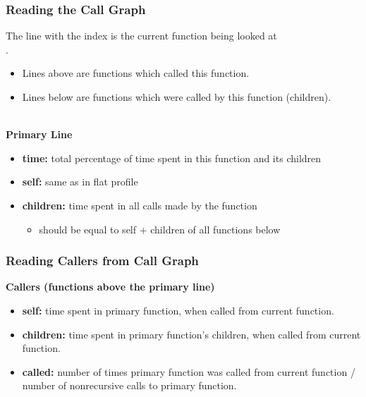 \documentclass[aspectratio=43]{beamer}
\newenvironment{changemargin}[1]{%
  \begin{list}{}{%
    \setlength{\topsep}{0pt}%
    \setlength{\leftmargin}{#1}%
    \setlength{\rightmargin}{1em}
    \setlength{\listparindent}{\parindent}%
    \setlength{\itemindent}{\parindent}%
    \setlength{\parsep}{\parskip}%
  }%
  \item[]}{\end{list}}
\begin{document}
\begin{frame}[fragile]
  \frametitle{Reading the Call Graph}

  \begin{changemargin}{1.5cm}
    The line with the index is the current function being looked at\\
      \qquad {}.\\
\begin{itemize}
    \item Lines above are functions which called this function.
    \item Lines below are functions which were called by this function
      (children).
  \end{itemize}
~\\
  {\bf Primary Line}

  \begin{itemize}  
    \item {\bf time:} total percentage of time spent in this function and its
      children
    \item {\bf self:} same as in flat profile
    \item {\bf children:} time spent in all calls made by the function
      \begin{itemize}
        \item should be equal to self + children of all functions below
      \end{itemize}
  \end{itemize}
  \end{changemargin}
\end{frame}

\begin{frame}[fragile]
  \frametitle{Reading Callers from Call Graph}

  \begin{changemargin}{2cm}
  {\bf Callers (functions above the primary line)}
  \begin{itemize}  
    \item {\bf self:} time spent in primary function, when called from current
      function.
    \item {\bf children:} time spent in primary function's children, when
      called from current function.
    \item {\bf called:} number of times primary function was called from current
      function / number of nonrecursive calls to primary function.
  \end{itemize}
  \end{changemargin}
\end{frame}
\end{document}
